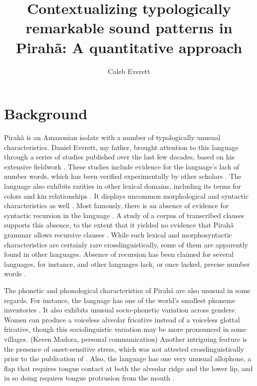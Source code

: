 \documentclass[output=paper,colorlinks,citecolor=brown
]{langscibook}
\title[Contextualizing typologically remarkable sound patterns in Pirah]{Contextualizing typologically remarkable sound patterns in Pirahã: A quantitative approach}
\author{Caleb Everett}
\date{}
\begin{document}
\label{chap-13_everett}

\maketitle
\abstract

\section{Background}

Pirahã is an Amazonian isolate with a number of typologically unusual characteristics. Daniel
Everett, my father, brought attention to this language through a series of studies published over
the last few decades, based on his extensive fieldwork \citep{everett1982phonetic,
  everett1984relevance,everett1986piraha,everett2001monolingual}. These studies include evidence for
the language's lack of number words, which has been verified experimentally by other scholars
\citep{frank2008number, everett2012quantity}. The language also exhibits rarities in other lexical
domains, including its terms for colors and kin relationships \citep{everett2005cultural}. It displays uncommon morphological and syntactic characteristics as well \citep{thomason2001pronoun, everett2012language}. Most famously, there is an absence of evidence for syntactic recursion in the language \citep{everett2005cultural}. A study of a corpus of transcribed clauses supports this absence, to the extent that it yielded no evidence that Pirahã grammar allows recursive clauses \citep{futrell2016corpus}. While such lexical and morphosyntactic characteristics are certainly rare crosslinguistically, some of them are apparently found in other languages. Absence of recursion has been claimed for several languages, for instance, and other languages lack, or once lacked, precise number words \citep{pullum2020theorizing, everett2017numbers}.
    
    The phonetic and phonological characteristics of Pirahã are also unusual in some regards. For instance, the language has one of the world’s smallest phoneme inventories \citep{everett2009piraha}. It also exhibits unusual socio-phonetic variation across genders: Women can produce a voiceless alveolar fricative instead of a voiceless glottal fricative, though this sociolinguistic variation may be more pronounced in some villages. (Keren Madora, personal communication) Another intriguing feature is the presence of onset-sensitive stress, which was not attested crosslinguistically prior to the publication of . Also, the language has one very unusual allophone, a flap that requires tongue contact at both the alveolar ridge and the lower lip, and in so doing requires tongue protrusion from the mouth \citep{everett1982phonetic}.
\end{document}
